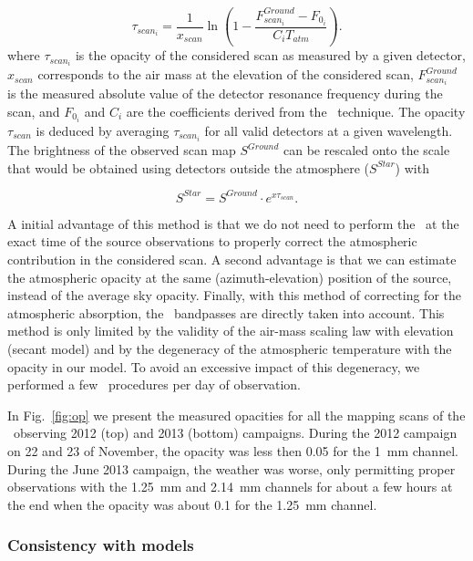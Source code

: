 \begin{equation}\label{eq:skydip2}
\tau_{scan_i}=\frac{1}{x_{scan}}\ln{(1-\frac{F^{Ground}_{scan_i}-F_{0_i}}{C_iT_{atm}})}.
\end{equation}
where $\tau_{scan_i}$ is the opacity of the considered scan as measured by a
given detector, $x_{scan}$ corresponds to the air mass at the elevation of the
considered scan, $F^{Ground}_{scan_i}$ is the measured absolute value of the
detector resonance frequency during the scan, and $F_{0_i}$ and $C_i$ are the
coefficients derived from the \Skydip\ technique. The opacity $\tau_{scan}$ is
deduced by averaging $\tau_{scan_i}$ for all valid detectors at a given
wavelength. The brightness of the observed scan map $S^{Ground}$ can be
rescaled onto the scale that would be obtained using detectors outside the
atmosphere ($S^{Star}$) with

\begin{equation}
S^{Star} =  S^{Ground} \cdot e^{ x \tau_{scan}}.
\end{equation}

A initial advantage of this method is that we do not need to perform the \Skydip\ at
the exact time of the source observations to properly correct the atmospheric
contribution in the considered scan. A second advantage is that we can
estimate the atmospheric opacity at the same (azimuth-elevation) position of the source,
instead of the average sky opacity. Finally, with this method of correcting for the atmospheric 
absorption, the \NIKA\ bandpasses are directly taken into account. This method is only limited by the
validity of the air-mass scaling law with elevation (secant model) and by the
degeneracy of the atmospheric temperature with the opacity in our model. To avoid an excessive impact of this degeneracy, we performed a few \Skydip\
procedures per day of observation.

In Fig.~\ref{fig:op} we present the measured opacities for all the mapping scans of the
\NIKA\ observing 2012 (top) and 2013 (bottom) campaigns. During the 2012 campaign
on 22 and 23 of November, the opacity was less then 0.05 for the 1~mm
channel. During the June 2013 campaign, the weather was worse, only permitting
proper observations with the 1.25~mm and 2.14~mm channels for about a few
hours at the end when the opacity was about 0.1 for the 1.25~mm channel.


\subsubsection{Consistency with models}

